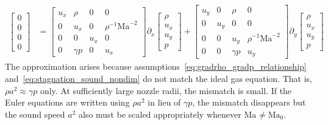 \documentclass[letterpaper,11pt,nointlimits,reqno]{amsart}
\newcommand{\Mach}[1][]{\mbox{Ma}_{#1}}
\begin{document}
\begin{align}
  \begin{bmatrix} 0 \\ 0 \\ 0 \\ 0 \end{bmatrix}
&=
  \begin{bmatrix}
     u_x  &  \rho      &  0    &  0                    \\
     0    &  u_x       &  0    &  \rho^{-1}\Mach^{-2}  \\
     0    &  0         &  u_x  &  0                    \\
     0    &  \gamma{}p &  0    &  u_x
  \end{bmatrix}
  \partial_x
  \begin{bmatrix} \rho \\ u_x \\ u_y \\ p \end{bmatrix}
+
  \begin{bmatrix}
     u_y  &  0    &  \rho       &  0                    \\
     0    &  u_y  &  0          &  0                    \\
     0    &  0    &  u_y        &  \rho^{-1}\Mach^{-2}  \\
     0    &  0    &  \gamma{}p  &  u_y
  \end{bmatrix}
  \partial_y
  \begin{bmatrix} \rho \\ u_x \\ u_y \\ p \end{bmatrix}
\end{align}
The approximation arises because
assumptions~\eqref{eq:gradrho_gradp_relationship}
and~\eqref{eq:stagnation_sound_nondim} do not match the ideal gas equation.
That is, $\rho a^2 \approx \gamma p$ only.  At sufficiently large nozzle radii,
the mismatch is small.  If the Euler equations are written using $\rho a^2$ in
lieu of $\gamma p$, the mismatch disappears but the sound speed $a^2$ also must
be scaled appropriately whenever $\Mach\neq\Mach[0]$.
\end{document}
